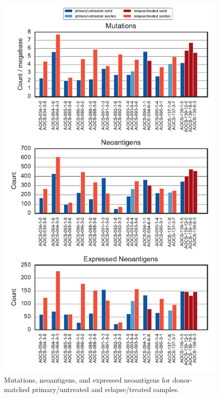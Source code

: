 \begin{figure}
\centering
\includegraphics[scale=1.0]{figures/paired_counts.pdf}
\caption{Mutations, neoantigens, and expressed neoantigens for donor-matched primary/untreated and relapse/treated samples.}
\label{fig:supp_paired}
\end{figure}

